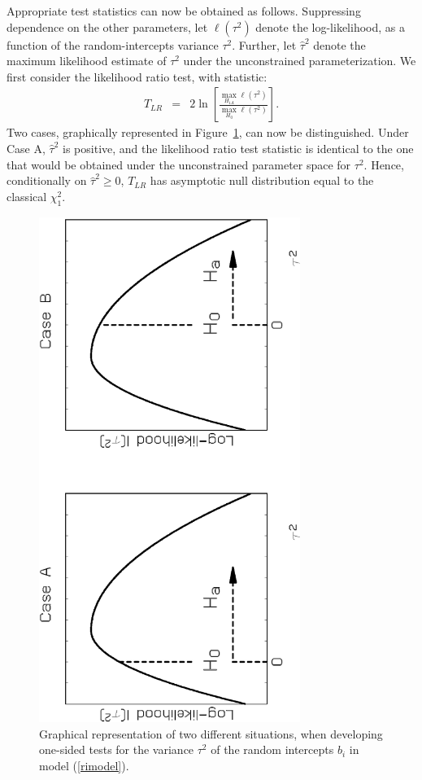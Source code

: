 \documentclass[useAMS,usenatbib,referee]{biom}
\begin{document}
Appropriate test statistics can now be obtained as
follows. Suppressing dependence on the other parameters, let
$\ell(\tau^2)$ denote the log-likelihood, as a function of the
random-intercepts variance $\tau^2$. Further, let $\widehat\tau^2$
denote the maximum likelihood estimate of $\tau^2$ under the
unconstrained parameterization.  We first consider the likelihood
ratio test, with statistic:
\begin{eqnarray*}
T_{LR} & = & 2 \ln \left[\frac{\max_{H_{1A}}
\ell(\tau^2)}{\max_{H_{0}} \ell(\tau^2)}\right].
\end{eqnarray*}
Two cases, graphically represented in Figure~\ref{figureone}, can now
be distinguished.  Under Case A, $\widehat\tau^2$ is positive, and the
likelihood ratio test statistic is identical to the one that would be
obtained under the unconstrained parameter space for $\tau^2$. Hence,
conditionally on $\widehat\tau^2 \geq 0$, $T_{LR}$ has asymptotic null
distribution equal to the classical $\chi^2_1$.

\begin{figure}
\begin{center}
\centerline{\includegraphics[angle=270,width=8.5cm]{tteken185.eps}}
\end{center}
\caption{Graphical representation of two different situations, when
developing one-sided tests for the variance $\tau^2$ of the random
intercepts $b_i$ in model (\protect\ref{rimodel}).
\label{figureone}}
\end{figure}
\end{document}
